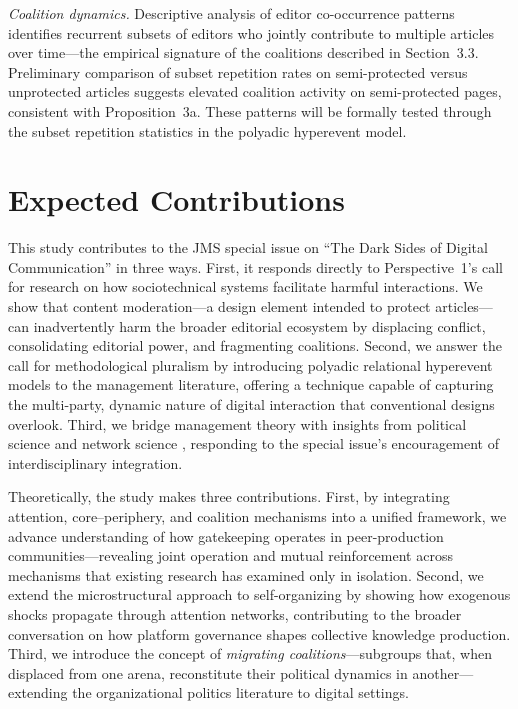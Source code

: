\documentclass[11pt]{article}
\begin{document}
\emph{Coalition dynamics.} Descriptive analysis of editor co-occurrence patterns identifies recurrent subsets of editors who jointly contribute to multiple articles over time---the empirical signature of the coalitions described in Section~3.3. Preliminary comparison of subset repetition rates on semi-protected versus unprotected articles suggests elevated coalition activity on semi-protected pages, consistent with Proposition~3a. These patterns will be formally tested through the subset repetition statistics in the polyadic hyperevent model.


\section{Expected Contributions}

This study contributes to the JMS special issue on ``The Dark Sides of Digital Communication'' in three ways. First, it responds directly to Perspective~1's call for research on how sociotechnical systems facilitate harmful interactions. We show that content moderation---a design element intended to protect articles---can inadvertently harm the broader editorial ecosystem by displacing conflict, consolidating editorial power, and fragmenting coalitions. Second, we answer the call for methodological pluralism by introducing polyadic relational hyperevent models to the management literature, offering a technique capable of capturing the multi-party, dynamic nature of digital interaction that conventional designs overlook. Third, we bridge management theory with insights from political science \citep{March1962} and network science \citep{Borgatti2000}, responding to the special issue's encouragement of interdisciplinary integration.

Theoretically, the study makes three contributions. First, by integrating attention, core--periphery, and coalition mechanisms into a unified framework, we advance understanding of how gatekeeping operates in peer-production communities---revealing joint operation and mutual reinforcement across mechanisms that existing research has examined only in isolation. Second, we extend the microstructural approach to self-organizing \citep{Tonellato2024} by showing how exogenous shocks propagate through attention networks, contributing to the broader conversation on how platform governance shapes collective knowledge production. Third, we introduce the concept of \emph{migrating coalitions}---subgroups that, when displaced from one arena, reconstitute their political dynamics in another---extending the organizational politics literature \citep{Levinthal2024} to digital settings.
\end{document}
